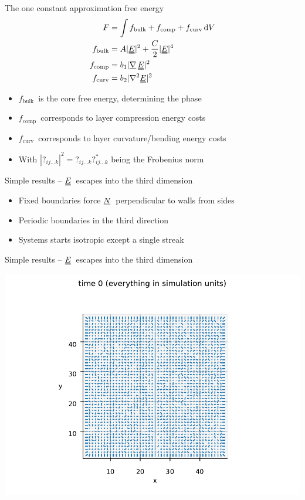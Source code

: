 \documentclass[10pt,mathserif]{beamer}
\newcommand{\suf}[2]{\stackunder[0.5pt]{\stackunder[1pt]{\ensuremath{#1}}{\rule{\widthof{\ensuremath{#2}}*\real{0.9}}{.1ex}}}{}}
\newcommand{\duf}[2]{\stackunder[0.5pt]{\stackunder[0.8pt]{\stackunder[1pt]{\ensuremath{#1}}{\rule{\widthof{\ensuremath{#2}}*\real{0.9}}{.1ex}}}{\rule{\widthof{\ensuremath{#2}}*\real{0.9}}{.1ex}}}{}}
\newcommand{\su}[1]{\suf{#1}{#1}}
\newcommand{\du}[1]{\duf{#1}{#1}}
\newcommand{\mgrad}{\ensuremath{\suf{\nabla}{K}\,}}
\newcommand{\NN}{\ensuremath{\su{N}}}
\newcommand{\EE}{\ensuremath{\du{E}}}
\newcommand{\FB}{\ensuremath{f_\text{bulk}}}
\newcommand{\FC}{\ensuremath{f_\text{comp}}}
\newcommand{\FU}{\ensuremath{f_\text{curv}}}
\newcommand{\extra}[1]{\color{gray} #1 \normalcolor}
\begin{document}
\begin{frame}[fragile]{The one constant approximation free energy}
    \newrefsection
    \begin{align*}
        F &= \int f_\text{bulk} + f_\text{comp} + f_\text{curv} \dd{V} \\
        f_\text{bulk} &= A |\EE|^2 + \frac{C}{2} |\EE|^4 \\
        f_\text{comp} &= b_1 |\mgrad \EE|^2 \\
        f_\text{curv} &= b_2 |\nabla^2 \EE|^2
    \end{align*}
    \begin{itemize}
        \item \FB\ is the core free energy, determining the phase
        \item \FC\ corresponds to layer compression energy costs
        \item \FU\ corresponds to layer curvature/bending energy costs
        \extra{\item With $|?_{ij\ldots k}|^2=?_{ij\ldots k}?_{ij\ldots k}^*$ being the Frobenius norm}
    \end{itemize}
\end{frame}

\begin{frame}[fragile]{Simple results -- \EE\ escapes into the third dimension}
    \newrefsection
    \begin{itemize}
        \item Fixed boundaries force \NN\ perpendicular to walls from sides
        \item Periodic boundaries in the third direction
        \item Systems starts isotropic except a single streak
    \end{itemize}
\end{frame}

\begin{frame}[fragile]{Simple results -- \EE\ escapes into the third dimension}
    \newrefsection
    \begin{center}
        \includegraphics[width=\textwidth]{figures/prelim0.pdf}
    \end{center}
\end{frame}
\end{document}
